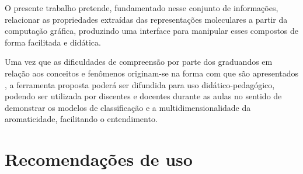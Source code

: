 


O presente trabalho pretende, fundamentado nesse conjunto de informações, relacionar as propriedades extraídas das representações moleculares a partir da computação gráfica, produzindo uma interface para manipular esses compostos de forma facilitada e didática. %

Uma vez que as dificuldades de compreensão por parte dos graduandos em relação aos conceitos e fenômenos originam-se na forma com que são apresentados \autocite{Cunha2018}, a ferramenta proposta poderá ser difundida para uso didático-pedagógico, podendo ser utilizada por discentes e docentes durante as aulas no sentido de demonstrar os modelos de classificação e a multidimensionalidade da aromaticidade, facilitando o entendimento.

\section{Recomendações de uso}

